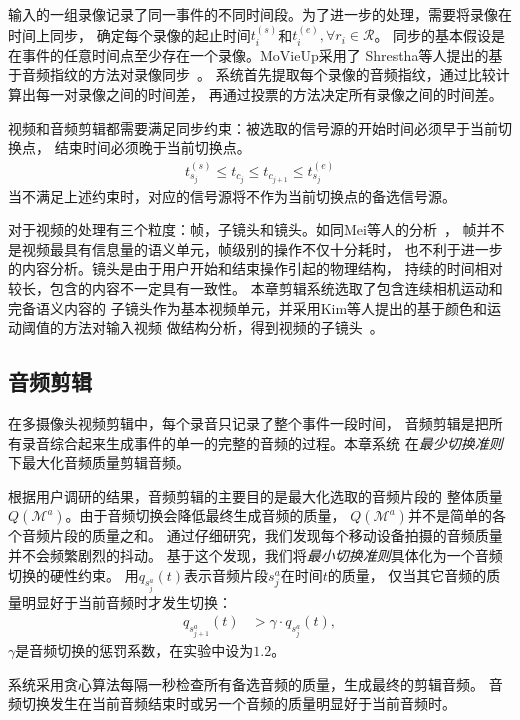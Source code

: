 \documentclass[doctor]{ustcthesis}
\begin{document}
输入的一组录像记录了同一事件的不同时间段。为了进一步的处理，需要将录像在时间上同步，
确定每个录像的起止时间$t_i^{(s)}$和$t_i^{(e)},\forall r_i \in \mathcal{R}$。
同步的基本假设是在事件的任意时间点至少存在一个录像。MoVieUp采用了
Shrestha等人提出的基于音频指纹的方法对录像同步~\cite{shresthabws10}。
系统首先提取每个录像的音频指纹，通过比较计算出每一对录像之间的时间差，
再通过投票的方法决定所有录像之间的时间差。

视频和音频剪辑都需要满足同步约束：被选取的信号源的开始时间必须早于当前切换点，
结束时间必须晚于当前切换点。
\begin{eqnarray}
    t_{s_j}^{(s)} \leq t_{c_j} \leq t_{c_{j+1}} \leq t_{s_j}^{(e)}
\end{eqnarray}
当不满足上述约束时，对应的信号源将不作为当前切换点的备选信号源。

对于视频的处理有三个粒度：帧，子镜头和镜头。如同Mei等人的分析~\cite{MeiHZZL07}，
帧并不是视频最具有信息量的语义单元，帧级别的操作不仅十分耗时，
也不利于进一步的内容分析。镜头是由于用户开始和结束操作引起的物理结构，
持续的时间相对较长，包含的内容不一定具有一致性。
本章剪辑系统选取了包含连续相机运动和完备语义内容的
子镜头作为基本视频单元，并采用Kim等人提出的基于颜色和运动阈值的方法对输入视频
做结构分析，得到视频的子镜头~\cite{KimCKK00}。

\subsection{音频剪辑}
在多摄像头视频剪辑中，每个录音只记录了整个事件一段时间，
音频剪辑是把所有录音综合起来生成事件的单一的完整的音频的过程。本章系统
在\emph{最少切换准则}下最大化音频质量剪辑音频。

根据用户调研的结果，音频剪辑的主要目的是最大化选取的音频片段的
整体质量$Q(\mathcal{M}^a)$。由于音频切换会降低最终生成音频的质量，
$Q(\mathcal{M}^a)$并不是简单的各个音频片段的质量之和。
通过仔细研究，我们发现每个移动设备拍摄的音频质量并不会频繁剧烈的抖动。
基于这个发现，我们将\emph{最小切换准则}具体化为一个音频切换的硬性约束。
用$q_{s_j^a}(t)$表示音频片段$s_j^a$在时间$t$的质量，
仅当其它音频的质量明显好于当前音频时才发生切换：
\begin{eqnarray}
    q_{s_{j+1}^a}{(t)} & > \gamma \cdot q_{s_j^a}{(t)},
    \label{equ:mashup-switch-constraint}
\end{eqnarray}
$\gamma$是音频切换的惩罚系数，在实验中设为$1.2$。

系统采用贪心算法每隔一秒检查所有备选音频的质量，生成最终的剪辑音频。
音频切换发生在当前音频结束时或另一个音频的质量明显好于当前音频时。
\end{document}
